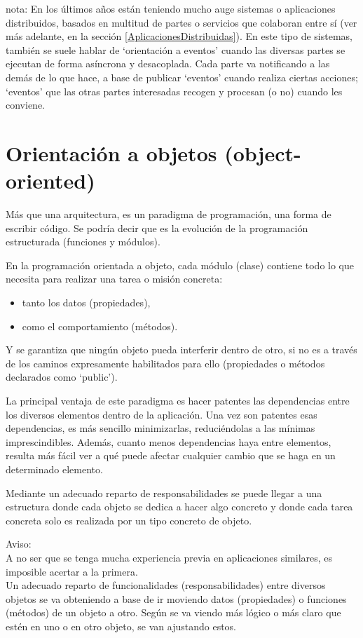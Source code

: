 \documentclass[spanish,12pt,a4paper,final,oneside]{book}
\begin{document}
nota: En los últimos años están teniendo mucho auge sistemas o aplicaciones distribuidos, basados en multitud de partes o servicios que colaboran entre sí (ver más adelante, en la sección  \ref{AplicacionesDistribuidas}). En este tipo de sistemas, también se suele hablar de `orientación a eventos' cuando las diversas partes se ejecutan de forma asíncrona y desacoplada. Cada parte va notificando a las demás de lo que hace, a base de publicar `eventos' cuando realiza ciertas acciones; `eventos' que las otras partes interesadas recogen y procesan (o no) cuando les conviene. 

\section{Orientación a objetos (object-oriented)}\label{oop}
Más que una arquitectura, es un paradigma de programación, una forma de escribir código. Se podría decir que es la evolución de la programación estructurada (funciones y módulos). 

En la programación orientada a objeto, cada módulo (clase) contiene todo lo que necesita para realizar una tarea o misión concreta: 
\begin{itemize}
\item tanto los datos (propiedades),
\item como el comportamiento (métodos).
\end{itemize}
Y se garantiza que ningún objeto pueda interferir dentro de otro, si no es a través de los caminos expresamente habilitados para ello (propiedades o métodos declarados como ‘public’).

La principal ventaja de este paradigma es hacer patentes las dependencias entre los diversos elementos dentro de la aplicación. Una vez son patentes esas dependencias, es más sencillo minimizarlas, reduciéndolas a las mínimas imprescindibles. Además, cuanto menos dependencias haya entre elementos, resulta más fácil ver a qué puede afectar cualquier cambio que se haga en un determinado elemento.

Mediante un adecuado reparto de responsabilidades se puede llegar a una estructura donde cada objeto se dedica a hacer algo concreto y donde cada tarea concreta solo es realizada por un tipo concreto de objeto.

Aviso: 
\\A no ser que se tenga mucha experiencia previa en aplicaciones similares, es imposible acertar a la primera. 
\\Un adecuado reparto de funcionalidades (responsabilidades) entre diversos objetos se va obteniendo a base de ir moviendo datos (propiedades) o funciones (métodos) de un objeto a otro. Según se va viendo más lógico o más claro que estén en uno o en otro objeto, se van ajustando estos.
\end{document}
